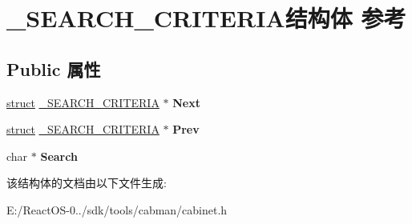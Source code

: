 \hypertarget{struct___s_e_a_r_c_h___c_r_i_t_e_r_i_a}{}\section{\+\_\+\+S\+E\+A\+R\+C\+H\+\_\+\+C\+R\+I\+T\+E\+R\+I\+A结构体 参考}
\label{struct___s_e_a_r_c_h___c_r_i_t_e_r_i_a}
\subsection*{Public 属性}
\begin{DoxyCompactItemize}
\item 
\mbox{\label{struct___s_e_a_r_c_h___c_r_i_t_e_r_i_a_ac0816b543e6349c2196c62b560c3b3b6}} 
\hyperlink{interfacestruct}{struct} \hyperlink{struct___s_e_a_r_c_h___c_r_i_t_e_r_i_a}{\+\_\+\+S\+E\+A\+R\+C\+H\+\_\+\+C\+R\+I\+T\+E\+R\+IA} $\ast$ {\bfseries Next}
\item 
\mbox{\label{struct___s_e_a_r_c_h___c_r_i_t_e_r_i_a_a03b689e0b1a87cf76eda8297b7ef2127}} 
\hyperlink{interfacestruct}{struct} \hyperlink{struct___s_e_a_r_c_h___c_r_i_t_e_r_i_a}{\+\_\+\+S\+E\+A\+R\+C\+H\+\_\+\+C\+R\+I\+T\+E\+R\+IA} $\ast$ {\bfseries Prev}
\item 
\mbox{\label{struct___s_e_a_r_c_h___c_r_i_t_e_r_i_a_a9901ec6b8a32c966712b0824b42b4521}} 
char $\ast$ {\bfseries Search}
\end{DoxyCompactItemize}


该结构体的文档由以下文件生成\+:\begin{DoxyCompactItemize}
\item 
E\+:/\+React\+O\+S-\/0../sdk/tools/cabman/cabinet.\+h\end{DoxyCompactItemize}
